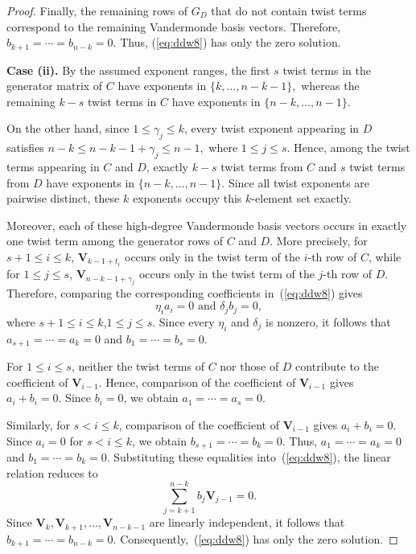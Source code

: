 \documentclass[10pt,a4paper]{amsart}
\begin{document}
\begin{proof}
Finally, the remaining rows of \(G_D\) that do not contain twist terms correspond to the remaining Vandermonde basis vectors. Therefore,
\(
b_{k+1}=\cdots=b_{n-k}=0.
\)
Thus, (\ref{eq:ddw8}) has only the zero solution.

\medskip
\noindent\textbf{Case (ii).}
By the assumed exponent ranges, the first \(s\) twist terms in the
generator matrix of \(C\) have exponents in
\(
\{k,\ldots,n-k-1\},
\)
whereas the remaining \(k-s\) twist terms in \(C\) have exponents in
\(
\{n-k,\ldots,n-1\}.
\)

On the other hand, since \(1\le \gamma_j\le k\), every twist exponent
appearing in \(D\) satisfies
\(
n-k\le n-k-1+\gamma_j\le n-1,
\)
where \(1\le j\le s\).
Hence, among the twist terms appearing in \(C\) and \(D\), exactly
\(k-s\) twist terms from \(C\) and \(s\) twist terms from \(D\) have
exponents in
\(
\{n-k,\ldots,n-1\}.
\)
Since all twist exponents are pairwise distinct, these \(k\) exponents
occupy this \(k\)-element set exactly.

Moreover, each of these high-degree Vandermonde basis vectors occurs
in exactly one twist term among the generator rows of \(C\) and \(D\).
More precisely, for \(s+1\le i\le k\),
\(\mathbf{V}_{k-1+t_i}\) occurs only in the twist term of the
\(i\)-th row of \(C\), while for \(1\le j\le s\),
\(\mathbf{V}_{n-k-1+\gamma_j}\) occurs only in the twist term of the
\(j\)-th row of \(D\). Therefore, comparing the corresponding
coefficients in~(\ref{eq:ddw8}) gives
\[
\eta_i a_i=0\text{ and }\delta_j b_j=0,
\]
where \(s+1\le i\le k\),\(1\le j\le s\).
Since every \(\eta_i\) and \(\delta_j\) is nonzero, it follows that
\(a_{s+1}=\cdots=a_k=0\) and \(b_1=\cdots=b_s=0\).

For \(1\le i\le s\), neither the twist terms of \(C\) nor those of
\(D\) contribute to the coefficient of \(\mathbf{V}_{i-1}\).
Hence, comparison of the coefficient of \(\mathbf{V}_{i-1}\) gives
\(
a_i+b_i=0.
\)
Since \(b_i=0\), we obtain
\(
a_1=\cdots=a_s=0.
\)

Similarly, for \(s<i\le k\), comparison of the coefficient of
\(\mathbf{V}_{i-1}\) gives
\(
a_i+b_i=0.
\)
Since \(a_i=0\) for \(s<i\le k\), we obtain
\(
b_{s+1}=\cdots=b_k=0.
\)
Thus,
\(a_1=\cdots=a_k=0\) and \(b_1=\cdots=b_k=0\).
Substituting these equalities into~(\ref{eq:ddw8}), the linear relation
reduces to
\[
\sum_{j=k+1}^{n-k} b_j\mathbf{V}_{j-1}=0.
\]
Since
\(
\mathbf{V}_k,\mathbf{V}_{k+1},\ldots,
\mathbf{V}_{n-k-1}
\)
are linearly independent, it follows that
\(
b_{k+1}=\cdots=b_{n-k}=0.
\)
Consequently,~(\ref{eq:ddw8}) has only the zero solution.


\end{proof}
\end{document}
